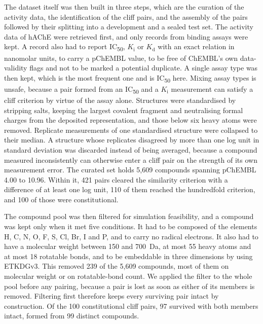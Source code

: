 The dataset itself was then built in three steps, which are the curation of the
activity data, the identification of the cliff pairs, and the assembly of the pairs
followed by their splitting into a development and a sealed test set. The activity data
of hAChE were retrieved first, and only records from binding assays were kept. A record
also had to report IC\textsubscript{50}, $K_\mathrm{i}$ or $K_\mathrm{d}$ with an exact
relation in nanomolar units, to carry a pChEMBL value, to be free of ChEMBL's own
data-validity flags and not to be marked a potential duplicate. A single assay type was
then kept, which is the most frequent one and is IC\textsubscript{50} here. Mixing
assay types is unsafe, because a pair formed from an IC\textsubscript{50} and a
$K_\mathrm{i}$ measurement can satisfy a cliff criterion by virtue of the assay alone.
Structures were standardised by stripping salts, keeping the largest covalent fragment
and neutralising formal charges from the deposited representation, and those below six
heavy atoms were removed. Replicate measurements of one standardised structure were
collapsed to their median. A structure whose replicates disagreed by more than one log
unit in standard deviation was discarded instead of being averaged, because a compound
measured inconsistently can otherwise enter a cliff pair on the strength of its own
measurement error. The curated set holds 5{,}609 compounds spanning pChEMBL 4.00 to
10.96. Within it, 421 pairs cleared the similarity criterion with a difference of at
least one log unit, 110 of them reached the hundredfold criterion, and 100 of those
were constitutional.

The compound pool was then filtered for simulation feasibility, and a compound was kept
only when it met five conditions. It had to be composed of the elements H, C, N, O, F,
S, Cl, Br, I and P, and to carry no radical electrons. It also had to have a molecular
weight between 150 and 700~Da, at most 55 heavy atoms and at most 18 rotatable bonds,
and to be embeddable in three dimensions by using ETKDGv3. This removed 239 of the
5{,}609 compounds, most of them on molecular weight or on rotatable-bond count. We
applied the filter to the whole pool before any pairing, because a pair is lost as soon
as either of its members is removed. Filtering first therefore keeps every surviving
pair intact by construction. Of the 100 constitutional cliff pairs, 97 survived with
both members intact, formed from 99 distinct compounds.

